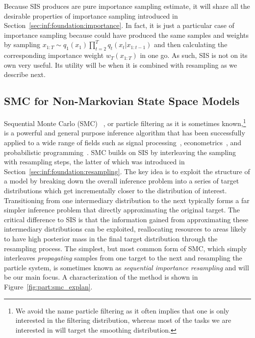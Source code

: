 Because SIS produces are pure importance sampling estimate, it will share all the desirable properties
of importance sampling introduced in Section~\ref{sec:inf:foundation:importance}.  In fact, it is just
a particular case of importance sampling because could have produced the same samples and weights
by sampling $x_{1:T} \sim q_1(x_1) \prod_{t=2}^{T} q_t (x_t | x_{1:t-1})$ and then calculating the
corresponding importance weight $w_T(x_{1:T})$ in one go. As such, 
SIS is not on its own very useful.  Its utility will be when it is combined with resampling as we describe next.

\subsection{SMC for Non-Markovian State Space Models}
\label{sec:part:smc:smc-nmssm}

Sequential Monte Carlo (SMC)~\citep{gordon1993novel,doucet2001sequential,doucet2009tutorial} , or particle filtering 
as it is sometimes known,\footnote{We avoid the name
	particle filtering as it often implies that one is only interested in the filtering distribution, whereas
	most of the tasks we are interested in will target the smoothing distribution.} 
is a powerful and general purpose inference algorithm that has been successfully
applied to a wide range of fields such as signal processing~\citep{candy2016bayesian}, econometrics~\citep{creal2012survey}, 
and probabilistic programming~\citep{wood2014new}.  SMC builds on SIS by interleaving the sampling
with resampling steps, the latter
of which was introduced in Section~\ref{sec:inf:foundation:resampling}.
The key idea is to exploit the structure of a model by breaking down the overall 
inference problem into a series of target distributions which get incrementally closer to the 
distribution of interest.  Transitioning from one intermediary distribution to the next typically
forms a far simpler inference problem that directly approximating the original target.  The critical difference
to SIS is that
the information gained from approximating these intermediary distributions can be exploited,
reallocating resources to areas likely to have high posterior mass in the final target distribution
through the resampling process.  The simplest, but most common form of SMC, which simply interleaves
\emph{propagating} samples from one target to the next and resampling the particle system, is sometimes known
as \emph{sequential importance resampling} and will be our main focus.
A characterization of the method is shown in Figure~\ref{fig:part:smc_explan}.  

